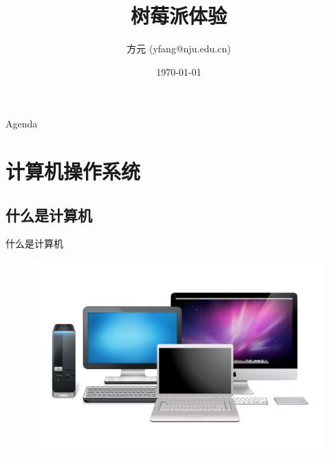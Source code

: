 \documentclass[14pt,t]{beamer}
\title[树莓派体验] %
{树莓派体验}
\subtitle{}
\author[Fang Yuan (yfang@nju.edu.cn)]
{方元 (yfang@nju.edu.cn)}
\institute[南京大学电子学院] %
{南京大学电子学院}
\date[expcourse] %
{\today}
\begin{document}
\begin{frame}
  \titlepage
\end{frame}

\begin{frame}{Agenda}
    \small
  \tableofcontents
\end{frame}





\section{计算机操作系统}

\subsection{什么是计算机}

\begin{frame}{什么是计算机}

\begin{figure}
\centering
\includegraphics[width=.5\textwidth]{computers.png}
\end{figure}
\end{frame}
\end{document}
